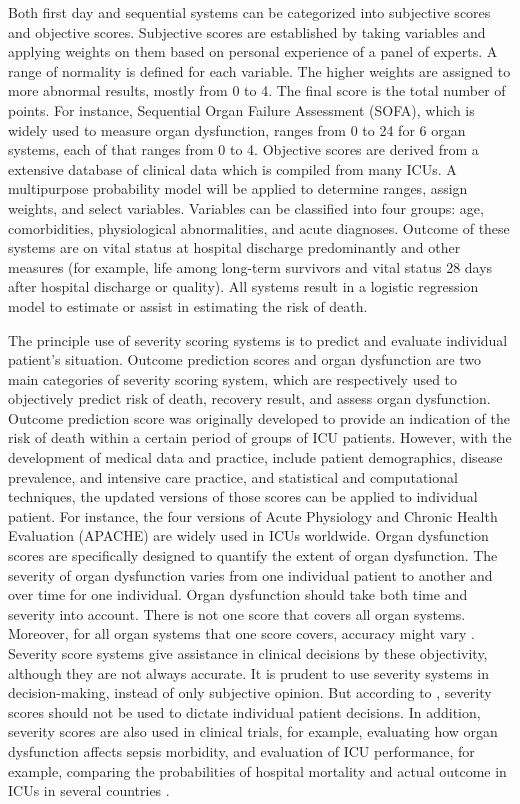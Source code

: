 \documentclass[12pt,a4paper,english
]{tunithesis}
\begin{document}
Both first day and sequential systems can be categorized into subjective scores and objective scores. Subjective scores are established by taking variables and applying weights on them based on personal experience of a panel of experts. A range of normality is defined for each variable. The higher weights are assigned to more abnormal results, mostly from 0 to 4. The final score is the total number of points. For instance, Sequential Organ Failure Assessment (SOFA), which is widely used to measure organ dysfunction, ranges from 0 to 24 for 6 organ systems, each of that ranges from 0 to 4. Objective scores are derived from a extensive database of clinical data which is compiled from many ICUs. A multipurpose probability model will be applied to determine ranges, assign weights, and select variables. Variables can be classified into four groups: age, comorbidities, physiological abnormalities, and acute diagnoses. Outcome of these systems are on vital status at hospital discharge predominantly and other measures (for example, life among long-term survivors and vital status 28 days after hospital discharge or quality). All systems result in a logistic regression model to estimate or assist in estimating the risk of death. \parencite{LeGall2005, Bouch2008} 

The principle use of severity scoring systems is to predict and evaluate individual patient's situation. Outcome prediction scores and organ dysfunction are two main categories of severity scoring system, which are respectively used to objectively predict risk of death, recovery result, and assess organ dysfunction. Outcome prediction score was originally developed to provide an indication of the risk of death within a certain period of groups of ICU patients. However, with the development of medical data and practice, include patient demographics, disease prevalence, and intensive care practice, and statistical and computational techniques, the updated versions of those scores can be applied to individual patient. For instance, the four versions of Acute Physiology and Chronic Health Evaluation (APACHE) \parencite{wagner1984} are widely used in ICUs worldwide. Organ dysfunction scores are specifically designed to quantify the extent of organ dysfunction. The severity of organ dysfunction varies from one individual patient to another and over time for one individual. Organ dysfunction should take both time and severity into account. There is not one score that covers all organ systems. Moreover, for all organ systems that one score covers, accuracy might vary \parencite{LeGall2005, Bouch2008, Vincent2010}. Severity score systems give assistance in clinical decisions by these objectivity, although they are not always accurate. It is prudent to use severity systems in decision-making, instead of only subjective opinion. But according to \textcite{LeGall2005, Vincent2010-at}, severity scores should not be used to dictate individual patient decisions. In addition, severity scores are also used in clinical trials, for example, evaluating how organ dysfunction affects sepsis morbidity, and evaluation of ICU performance, for example, comparing the probabilities of hospital mortality and actual outcome in ICUs in several countries \parencite{LeGall2005, Vincent2010}.
\end{document}
